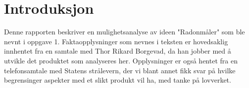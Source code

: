 \section{Introduksjon}

Denne rapporten beskriver en mulighetsanalyse av ideen "Radonmåler" som ble nevnt i oppgave 1. Faktaopplysninger som nevnes i teksten er hovedsaklig innhentet fra en samtale med Thor Rikard Borgevad, da han jobber med å utvikle det produktet som analyseres her. Opplysninger er også hentet fra en telefonsamtale med Statens strålevern, der vi blant annet fikk svar på hvilke begrensinger aspekter med et slikt produkt vil ha, med tanke på lovverket. 

